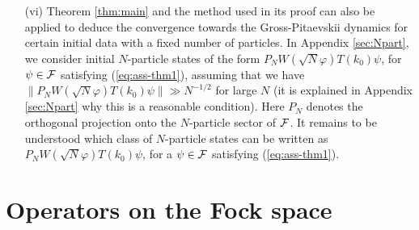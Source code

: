 \documentclass[11pt,a4paper]{article}
\newtheorem{thm}{Theorem}[section]  %
\newcommand{\eps}{\varepsilon}
\newcommand{\bR}{{\mathbb R}}
\newcommand{\bN}{{\mathbb N}}
\newcommand{\tr}{\mbox{Tr}}
\newcommand{\cF}{{\cal F}}
\newcommand{\cH}{{\cal H}}
\begin{document}
\begin{itemize}
\item[(vi)] Theorem \ref{thm:main} and the method used in its proof can also be applied to deduce the convergence towards the Gross-Pitaevskii dynamics for certain initial data with a fixed number of particles. In Appendix \ref{sec:Npart}, we consider initial $N$-particle states of the form 
$P_N W(\sqrt{N} \varphi) T(k_0) \psi$, for $\psi \in \cF$ satisfying (\ref{eq:ass-thm1}), assuming that we have $\| P_N W(\sqrt{N} \varphi) T(k_0) \psi \| \gg N^{-1/2}$ for large $N$ (it is explained in Appendix \ref{sec:Npart} why this is a reasonable condition). Here $P_N$ denotes the orthogonal projection onto the $N$-particle sector of $\cF$. It remains to be understood which class of $N$-particle states can be written as $P_N W(\sqrt{N} \varphi) T(k_0) \psi$, for a $\psi \in \cF$ satisfying (\ref{eq:ass-thm1}).
\end{itemize}



\section{Operators on the Fock space}
\label{sec:fock}
\end{document}
